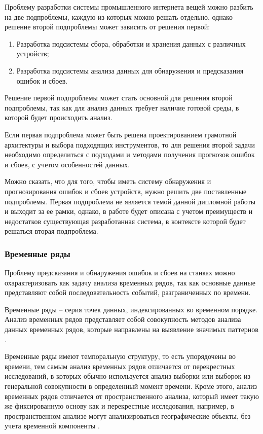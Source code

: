 Проблему разработки системы промышленного интернета вещей можно разбить на две подпроблемы,
каждую из которых можно решать отдельно, однако решение второй подпроблемы может зависить от решения первой:

\begin{enumerate}
    \item Разработка подсистемы сбора, обработки и хранения данных с различных устройств;
    \item Разработка подсистемы анализа данных для обнаружения и предсказания ошибок и сбоев.
\end{enumerate}

Решение первой подпроблемы может стать основной для решения второй подпроблемы,
так как для анализ данных требует наличие готовой среды, в которой
будет происходить анализ.

Если первая подпроблема может быть решена проектированием грамотной архитектуры и выбора подходящих инструментов,
то для решения второй задачи необходимо определиться с подходами и методами
получения прогнозов ошибок и сбоев, с учетом особенностей данных.

Можно сказать, что для того, чтобы иметь систему обнаружения и прогнозирования ошибок и сбоев устройств,
нужно решить две поставленные подпроблемы. Первая подпроблема не является темой данной дипломной работы
и выходит за ее рамки, однако, в работе будет описана с учетом преимуществ и недостатков существующая разработанная система,
в контексте которой будет решаться вторая подпроблема.

\subsubsection{Временные ряды}

Проблему предсказания и обнаружения ошибок и сбоев на станках можно охарактеризовать как задачу анализа временных рядов,
так как основные данные представляют собой последовательность событий,
разграниченных по времени.

Временные ряды -- серия точек данных, индексированных во временном порядке.
Анализ временных рядов представляет собой совокупность методов анализа данных временных рядов,
которые направлены на выявление значимых паттернов \cite{box-series} .

Временные ряды имеют темпоральную структуру, то есть упорядочены во времени,
тем самым анализ временных рядов отличается от перекрестных исследований,
в которых обычно используется анализ выборки или выборок из генеральной совокупности в определенный момент времени.
Кроме этого, анализ временных рядов отличается от пространственного анализа,
который имеет такую же фиксированную основу как и перекрестные исследования,
например, в пространственном анализе могут анализироваться географические объекты, без учета временной компоненты \cite{shumway-series} .

